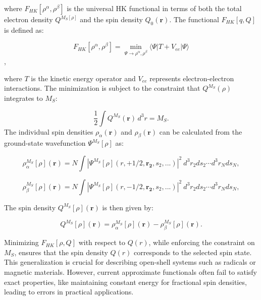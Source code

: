 \documentclass[%
 preprint, linenumbers,
 amsmath,amssymb,
 aps, physrev,
]{revtex4-2}
\begin{document}
where \( F_{HK}[\rho^\alpha, \rho^\beta] \) is the universal HK functional in terms of both the total electron density \( Q^{M_S[\rho]} \) and the spin density \( Q_0(\mathbf{r}) \). The functional \( F_{HK}[q, Q] \) is defined as:


\begin{equation}
    F_{HK}[\rho^{\alpha}, \rho^{\beta}] = \min_{\Psi \to \rho^{\alpha},  \rho^{\beta}} \langle \Psi | T + V_{ee} | \Psi \rangle
\end{equation},


where \( T \) is the kinetic energy operator and \( V_{ee} \) represents electron-electron interactions. The minimization is subject to the constraint that \( Q^{M_S}(\rho) \) integrates to \( M_S \):

\begin{equation}
    \frac{1}{2} \int Q^{M_S}(\mathbf{r}) \, d^3r = M_S.
\end{equation}
The individual spin densities \( \rho_\alpha(\mathbf{r}) \) and \( \rho_\beta(\mathbf{r}) \) can be calculated from the ground-state wavefunction \( \Psi^{M_S}[\rho] \) as:


\begin{equation}
    \rho_\alpha^{M_S}[\rho](\mathbf{r}) = N \int |\Psi^{M_S}[\rho](r, +1/2, \mathbf{r_2},s_2,...)|^2 \ d^3r_2 ds_2\cdots d^3r_N ds_N,
\end{equation}

\begin{equation}
    \rho_\beta^{M_S}[\rho](\mathbf{r}) = N \int |\Psi^{M_S}[\rho](r, -1/2, \mathbf{r_2},s_2,...)|^2 \ d^3r_2 ds_2\cdots d^3r_N ds_N,
\end{equation}

The spin density \( Q^{M_S}[\rho](\mathbf{r}) \) is then given by:

\begin{equation}
    Q^{M_S}[\rho](\mathbf{r}) = \rho_\alpha^{M_S}[\rho](\mathbf{r}) - \rho_\beta^{M_S}[\rho](\mathbf{r}).
\end{equation}

Minimizing \( F_{HK}[\rho, Q] \) with respect to \( Q(r) \), while enforcing the constraint on \( M_S \), ensures that the spin density \( Q(r) \) corresponds to the selected spin state. This generalization is crucial for describing open-shell systems such as radicals or magnetic materials. However, current approximate functionals often fail to satisfy exact properties, like maintaining constant energy for fractional spin densities, leading to errors in practical applications. 
\end{document}
